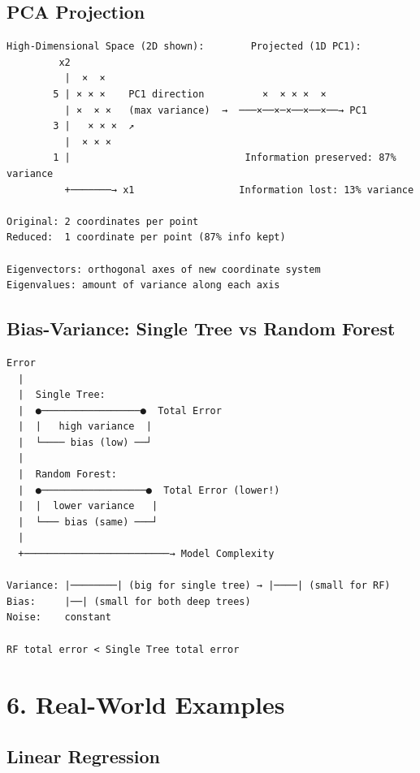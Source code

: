 \documentclass[11pt]{article}
\begin{document}
\subsection{PCA Projection}\label{pca-projection}

\setcodelang{}

\begin{verbatim}
High-Dimensional Space (2D shown):        Projected (1D PC1):
         x2
          |  ×  ×
        5 | × × ×    PC1 direction          ×  × × ×  ×
          | ×  × ×   (max variance)  →  ───×──×─×──×──×──→ PC1
        3 |   × × ×  ↗
          |  × × ×
        1 |                              Information preserved: 87% variance
          +───────→ x1                  Information lost: 13% variance

Original: 2 coordinates per point
Reduced:  1 coordinate per point (87% info kept)

Eigenvectors: orthogonal axes of new coordinate system
Eigenvalues: amount of variance along each axis
\end{verbatim}

\subsection{Bias-Variance: Single Tree vs Random Forest}\label{bias-variance-single-tree-vs-random-forest}

\setcodelang{}

\begin{verbatim}
Error
  |
  |  Single Tree:
  |  ●─────────────────●  Total Error
  |  |   high variance  |
  |  └──── bias (low) ──┘
  |
  |  Random Forest:
  |  ●──────────────────●  Total Error (lower!)
  |  |  lower variance   |
  |  └─── bias (same) ───┘
  |
  +─────────────────────────→ Model Complexity

Variance: |────────| (big for single tree) → |────| (small for RF)
Bias:     |──| (small for both deep trees)
Noise:    constant

RF total error < Single Tree total error
\end{verbatim}

\section{6. Real-World Examples}\label{6-real-world-examples}

\subsection{Linear Regression}\label{linear-regression}
\end{document}
